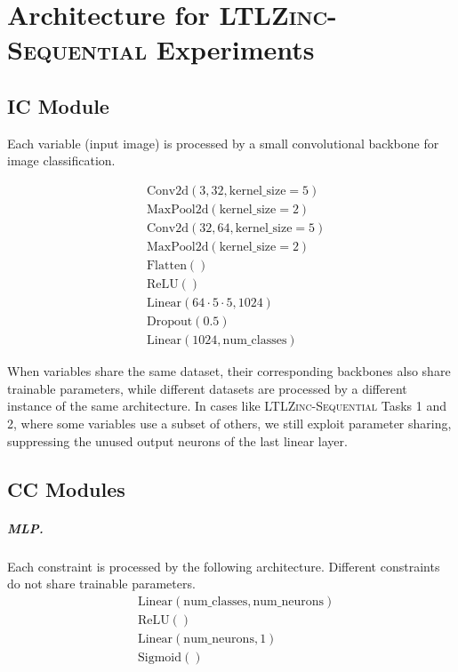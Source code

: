 \chapter{Architecture for \textsc{LTLZinc-Sequential} Experiments}\label{app:ltlzincarc}

\section{\textsc{IC} Module}\label{app:backbone}
Each variable (input image) is processed by a small convolutional backbone for image classification.

\begin{align*}
	&\mathrm{Conv2d(3, 32, kernel\_size=5)}\\
	&\mathrm{MaxPool2d(kernel\_size=2)}\\
	&\mathrm{Conv2d(32, 64, kernel\_size=5)}\\
	&\mathrm{MaxPool2d(kernel\_size=2)}\\
	&\mathrm{Flatten()}\\
	&\mathrm{ReLU()}\\
	&\mathrm{Linear(64 \cdot 5 \cdot 5, 1024)}\\
	&\mathrm{Dropout(0.5)}\\
	&\mathrm{Linear(1024, num\_classes)}
\end{align*}

When variables share the same dataset, their corresponding backbones also share trainable parameters, while different datasets are processed by a different instance of the same architecture. In cases like \textsc{LTLZinc-Sequential} Tasks 1 and 2, where some variables use a subset of others, we still exploit parameter sharing, suppressing the unused output neurons of the last linear layer.

\section{\textsc{CC} Modules}\label{app:constraints}
\paragraph{MLP.}
Each constraint is processed by the following architecture. Different constraints do not share trainable parameters.
\begin{align*}
	&\mathrm{Linear(num\_classes, num\_neurons)}\\
	&\mathrm{ReLU()}\\
	&\mathrm{Linear(num\_neurons, 1)}\\
	&\mathrm{Sigmoid()}\\
\end{align*}

